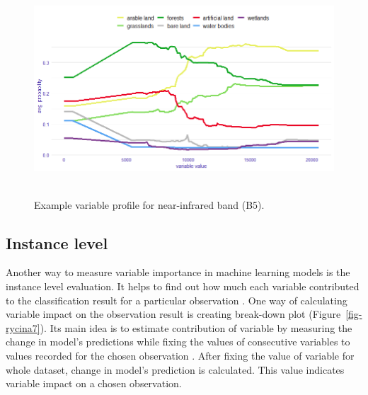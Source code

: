 \documentclass{amuthesis}
\begin{document}
\begin{figure}[t]

{\centering \includegraphics[width=5.625in,height=3.125in]{./figures/profB5.png}

}

\caption{\label{fig-rycina6}Example variable profile for near-infrared
band (B5).}

\end{figure}

\hypertarget{sec-importance-instance}{%
\subsection{Instance level}\label{sec-importance-instance}}

Another way to measure variable importance in machine learning models is
the instance level evaluation. It helps to find out how much each
variable contributed to the classification result for a particular
observation \autocite{biecek_explanatory_2021}. One way of calculating
variable impact on the observation result is creating break-down plot
(Figure~\ref{fig-rycina7}). Its main idea is to estimate contribution of
variable by measuring the change in model's predictions while fixing the
values of consecutive variables to values recorded for the chosen
observation \autocite{biecek_explanatory_2021}. After fixing the value
of variable for whole dataset, change in model's prediction is
calculated. This value indicates variable impact on a chosen
observation.
\end{document}
